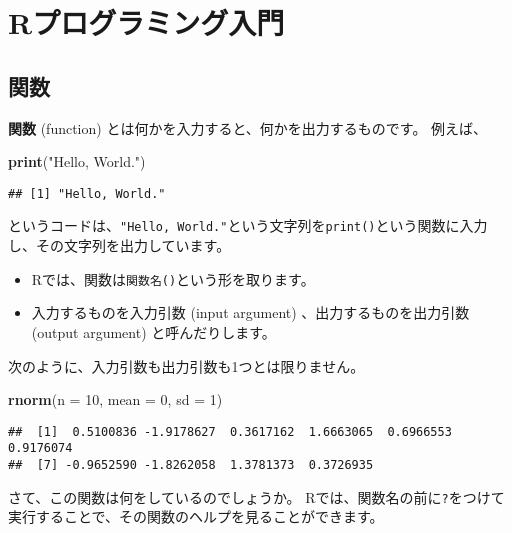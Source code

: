 \documentclass[]{bxjsarticle}
\newenvironment{Shaded}{\begin{snugshade}}{\end{snugshade}}
\newcommand{\DataTypeTok}[1]{\textcolor[rgb]{0.13,0.29,0.53}{#1}}
\newcommand{\DecValTok}[1]{\textcolor[rgb]{0.00,0.00,0.81}{#1}}
\newcommand{\KeywordTok}[1]{\textcolor[rgb]{0.13,0.29,0.53}{\textbf{#1}}}
\newcommand{\NormalTok}[1]{#1}
\newcommand{\StringTok}[1]{\textcolor[rgb]{0.31,0.60,0.02}{#1}}
\providecommand{\tightlist}{%
  \setlength{\itemsep}{0pt}\setlength{\parskip}{0pt}}
\begin{document}
\hypertarget{intro-r}{%
\section{Rプログラミング入門}\label{intro-r}}

\hypertarget{ux95a2ux6570}{%
\subsection{関数}\label{ux95a2ux6570}}

\textbf{関数} (function) とは何かを入力すると、何かを出力するものです。
例えば、

\begin{Shaded}
\begin{Highlighting}[]
\KeywordTok{print}\NormalTok{(}\StringTok{"Hello, World."}\NormalTok{)}
\end{Highlighting}
\end{Shaded}

\begin{verbatim}
## [1] "Hello, World."
\end{verbatim}

というコードは、\texttt{"Hello,\ World."}という文字列を\texttt{print()}という関数に入力し、その文字列を出力しています。

\begin{itemize}
\tightlist
\item
  Rでは、関数は\texttt{関数名()}という形を取ります。
\item
  入力するものを入力引数 (input argument) 、出力するものを出力引数 (output argument) と呼んだりします。
\end{itemize}

次のように、入力引数も出力引数も1つとは限りません。

\begin{Shaded}
\begin{Highlighting}[]
\KeywordTok{rnorm}\NormalTok{(}\DataTypeTok{n =} \DecValTok{10}\NormalTok{, }\DataTypeTok{mean =} \DecValTok{0}\NormalTok{, }\DataTypeTok{sd =} \DecValTok{1}\NormalTok{)}
\end{Highlighting}
\end{Shaded}

\begin{verbatim}
##  [1]  0.5100836 -1.9178627  0.3617162  1.6663065  0.6966553  0.9176074
##  [7] -0.9652590 -1.8262058  1.3781373  0.3726935
\end{verbatim}

さて、この関数は何をしているのでしょうか。
Rでは、関数名の前に\texttt{?}をつけて実行することで、その関数のヘルプを見ることができます。
\end{document}
